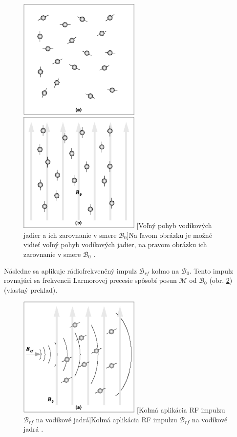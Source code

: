 \begin {figure}[H]
        \centering
        \includegraphics[height=6cm]{media/hydrogen/hydrogen_moving_freely.png}
        \includegraphics[height=6cm]{media/hydrogen/hydrogen_oscilating.png}
        \captionsetup{justification=centering}
        [Voľný pohyb vodíkových jadier a ich zarovnanie v smere $\mathcal{B}_{0}$]{Na ľavom obrázku je možné vidieť voľný pohyb vodíkových jadier, na pravom obrázku ich zarovnanie v smere $\mathcal{B}_{0}$ \cite{basic_principles_of_mri}.}
        \label{fig:atoms}
\end {figure}

Následne sa aplikuje rádiofrekvenčný impulz $\mathcal{B}_{rf}$ kolmo na $\mathcal{B}_{0}$.
Tento impulz rovnajúci sa frekvencii Larmorovej precesie spôsobí posun $\mathcal{M}$ od $\mathcal{B}_{0}$ (obr. \ref{fig:atoms_move}) \cite{basic_principles_of_mri} (vlastný preklad).

\clearpage

\begin {figure}[H]
        \centering
        \includegraphics[height=6cm]{media/hydrogen/hydrogen_reacting_to_rf.png}
        \captionsetup{justification=centering}
        [Kolmá aplikácia RF impulzu $\mathcal{B}_{rf}$ na vodíkové jadrá]{Kolmá aplikácia RF impulzu $\mathcal{B}_{rf}$ na vodíkové jadrá \cite{basic_principles_of_mri}.}
        \label{fig:atoms_move}
\end {figure}

